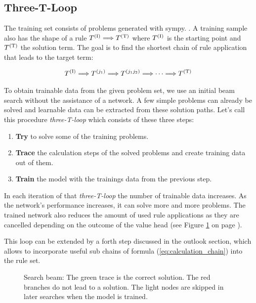 \documentclass{scrartcl}
\theoremstyle{definition}
\begin{document}
\subsection{Three-T-Loop}

The training set consists of problems generated with sympy. \cite{10.7717/peerj-cs.103}.
A training sample also has the shape of a rule $T^{(\text I)} \Longrightarrow T^{(\text T)}$ where $T^{(\text I)}$ is the starting point and $T^{(\text T)}$ the solution term.
The goal is to find the shortest chain of rule application that leads to the target term:

\begin{align}
	T^{(\text I)} \Longrightarrow T^{(j_1)} \Longrightarrow T^{(j_1j_2)} \Longrightarrow \cdots \Longrightarrow T^{(\text T)}
	\label{eq:calculation_chain}
\end{align}

To obtain trainable data from the given problem set, we use an initial beam search without the assistance of a network.
A few simple problems can already be solved and learnable data can be extracted from these solution paths.
Let's call this procedure \textit{three-T-loop} which consists of these three steps:

\begin{enumerate}[label=(\roman*)]
	\item \textbf{Try} to solve some of the training problems.
	\item \textbf{Trace} the calculation steps of the solved problems and create training data out of them.
	\item \textbf{Train} the model with the trainings data from the previous step.
\end{enumerate}

In each iteration of that \textit{three-T-loop} the number of trainable data increases. 
As the network's performance increases, it can solve more and more problems.
The trained network also reduces the amount of used rule applications as they are cancelled depending on the outcome of the value head (see Figure \ref{fig:beam_search} on page \pageref{fig:beam_search}). 


This loop can be extended by a forth step discussed in the outlook section, which allows to incorporate useful sub chains of formula (\ref{eq:calculation_chain}) into the rule set.

\begin{figure}[!htbp]
	\centering
	
	\caption{Search beam: The green trace is the correct solution.
	The red branches do not lead to a solution.
	The light nodes are skipped in later searches when the model is trained.}
	\label{fig:beam_search}
\end{figure}
\end{document}
